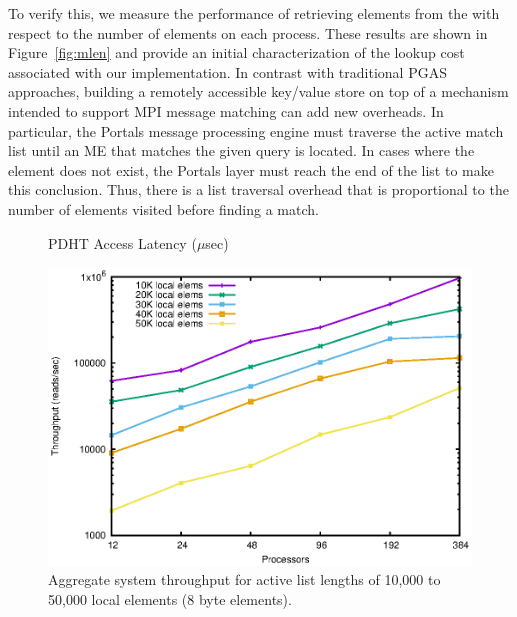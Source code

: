 To verify this, we measure the performance of retrieving elements from
the \pdht with respect to the number of elements on each process.
These results are shown in Figure~\ref{fig:mlen} and provide an
initial characterization of the lookup cost associated with our \pdht
implementation.  In contrast with traditional PGAS approaches,
building a remotely accessible key/value store on top of a mechanism
intended to support MPI message matching can add new overheads.  In
particular, the Portals message processing engine must traverse the
active match list until an ME that matches the given query is located.
In cases where the element does not exist, the Portals layer must
reach the end of the list to make this conclusion.  Thus, there is a
list traversal overhead that is proportional to the number of elements
visited before finding a match.









\begin{figure}[ht]
  \center
  \fbox{\rule{2.5in}{0pt}\rule[-2.5in]{0pt}{4ex}}  
  \caption{PDHT Access Latency ($\mu$sec)}
  \label{fig:6}
\end{figure}

\begin{figure}
    \centering
    \includegraphics[width=.9\linewidth]{plots/throughput}
    \caption{Aggregate system throughput for active list lengths of 10,000 to 50,000 local elements (8 byte elements).}
    \label{fig:throughput}
\end{figure}

